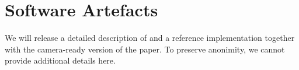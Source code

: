 %


%


\newpage

\section*{Software Artefacts}

We will release a detailed description of \tcpls and a reference implementation
together with the camera-ready version of the paper. To preserve anonimity,
we cannot provide additional details here. 


